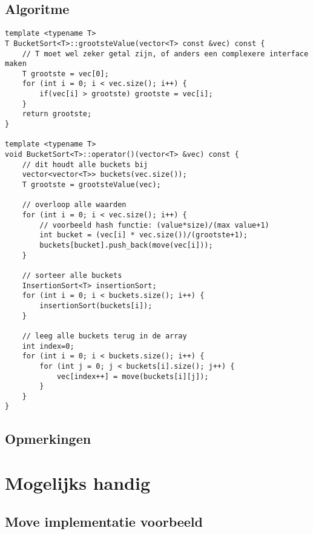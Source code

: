 \documentclass[a4paper]{article}
\begin{document}
\subsection*{Algoritme}

\begin{lstlisting}
template <typename T>
T BucketSort<T>::grootsteValue(vector<T> const &vec) const {
	// T moet wel zeker getal zijn, of anders een complexere interface maken
	T grootste = vec[0];
	for (int i = 0; i < vec.size(); i++) {
		if(vec[i] > grootste) grootste = vec[i];
	}
	return grootste;
}

template <typename T>
void BucketSort<T>::operator()(vector<T> &vec) const {
	// dit houdt alle buckets bij
	vector<vector<T>> buckets(vec.size());
	T grootste = grootsteValue(vec);

	// overloop alle waarden
	for (int i = 0; i < vec.size(); i++) {
		// voorbeeld hash functie: (value*size)/(max value+1)
		int bucket = (vec[i] * vec.size())/(grootste+1);
		buckets[bucket].push_back(move(vec[i]));
	}
	
	// sorteer alle buckets
	InsertionSort<T> insertionSort;
	for (int i = 0; i < buckets.size(); i++) {
		insertionSort(buckets[i]);
	}

	// leeg alle buckets terug in de array
	int index=0;
	for (int i = 0; i < buckets.size(); i++) {
		for (int j = 0; j < buckets[i].size(); j++) {
			vec[index++] = move(buckets[i][j]);
		}
	}
}
\end{lstlisting}

\subsection*{Opmerkingen}
\newpage

\section{Mogelijks handig}
\subsection*{Move implementatie voorbeeld}
\label{sub:Move implementatie voorbeeld}
\end{document}
